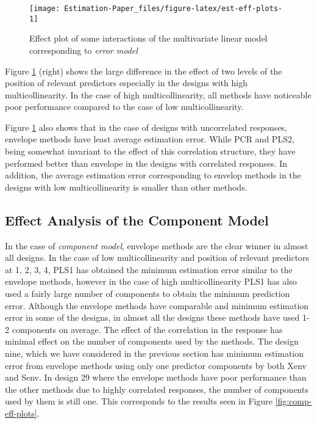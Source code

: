 \documentclass[12pt,3p,authoryear]{elsarticle}
\begin{document}
\begin{figure}
\texttt{[image: Estimation-Paper\_files/figure-latex/est-eff-plots-1]} \caption{Effect plot of some interactions of the multivariate linear model corresponding to \emph{error model}}\label{fig:est-eff-plots}
\end{figure}

Figure \ref{fig:est-eff-plots} (right) shows the large difference in the effect of two levels of the position of relevant predictors especially in the designs with high multicollinearity. In the case of high multicollinearity, all methods have noticeable poor performance compared to the case of low multicollinearity.

Figure \ref{fig:est-eff-plots} also shows that in the case of designs with uncorrelated responses, envelope methods have least average estimation error. While PCR and PLS2, being somewhat invariant to the effect of this correlation structure, they have performed better than envelope in the designs with correlated responses. In addition, the average estimation error corresponding to envelop methods in the designs with low multicollinearity is smaller than other methods.

\hypertarget{effect-analysis-of-the-component-model}{%
\subsection{Effect Analysis of the Component Model}\label{effect-analysis-of-the-component-model}}

In the case of \emph{component model}, envelope methods are the clear winner in almost all designs. In the case of low multicollinearity and position of relevant predictors at 1, 2, 3, 4, PLS1 has obtained the minimum estimation error similar to the envelope methods, however in the case of high multicollinearity PLS1 has also used a fairly large number of components to obtain the minimum prediction error. Although the envelope methods have comparable and minimum estimation error in some of the designs, in almost all the designs these methods have used 1-2 components on average. The effect of the correlation in the response has minimal effect on the number of components used by the methods. The design nine, which we have considered in the previous section has minimum estimation error from envelope methods using only one predictor components by both Xenv and Senv. In design 29 where the envelope methods have poor performance than the other methods due to highly correlated responses, the number of components used by them is still one. This corresponds to the results seen in Figure \ref{fig:comp-eff-plots}.
\end{document}
